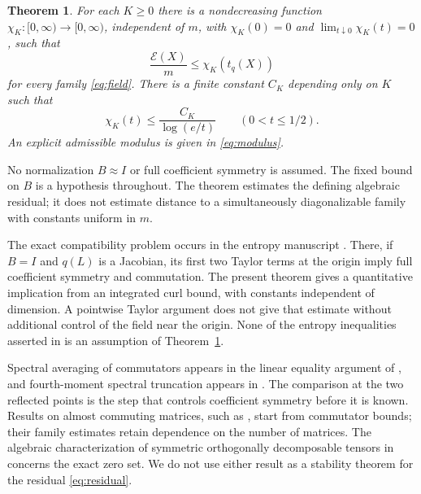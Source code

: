 \documentclass[11pt,reqno]{amsart}
\numberwithin{equation}{section}
\newtheorem{theorem}{Theorem}[section]
\theoremstyle{remark}
\begin{document}
\begin{theorem}\label{thm:main}
For each $K\ge0$ there is a nondecreasing function
$\chi_K:[0,\infty)\to[0,\infty)$, independent of $m$, with
$\chi_K(0)=0$ and $\lim_{t\downarrow0}\chi_K(t)=0$, such that
\begin{equation}\label{eq:main}
 \frac{\mathcal E(X)}m\le\chi_K(t_q(X))
\end{equation}
for every family \eqref{eq:field}. There is a finite constant $C_K$
depending only on $K$ such that
\begin{equation}\label{eq:rate}
 \chi_K(t)\le\frac{C_K}{\log(e/t)}\qquad(0<t\le1/2).
\end{equation}
An explicit admissible modulus is given in \eqref{eq:modulus}.
\end{theorem}

No normalization $B\approx I$ or full coefficient symmetry is assumed.
The fixed bound on $B$ is a hypothesis throughout. The theorem estimates
the defining algebraic residual; it does not estimate distance to a
simultaneously diagonalizable family with constants uniform in $m$.

The exact compatibility problem occurs in the entropy manuscript
\cite[section ``From vanishing slack to exponential products'']{Entropy}.
There, if $B=I$ and $q(L)$ is a Jacobian, its first two Taylor terms
at the origin imply full coefficient symmetry and commutation. The
present theorem gives a quantitative implication from an integrated
curl bound, with constants independent of dimension. A pointwise
Taylor argument does not give that estimate without additional control
of the field near the origin. None of the entropy inequalities asserted
in \cite{Entropy} is an assumption of Theorem~\ref{thm:main}.

Spectral averaging of commutators appears in the linear equality
argument of \cite{Mahler}, and fourth-moment spectral truncation appears
in \cite[section 10]{Tracial}. The comparison at the two reflected
points is the step that controls coefficient symmetry before it is
known. Results on almost commuting matrices, such as
\cite{FK}, start from commutator bounds; their family estimates retain
dependence on the number of matrices. The algebraic characterization
of symmetric orthogonally decomposable tensors in \cite{BDHR} concerns
the exact zero set. We do not use either result as a stability theorem
for the residual \eqref{eq:residual}.
\end{document}

